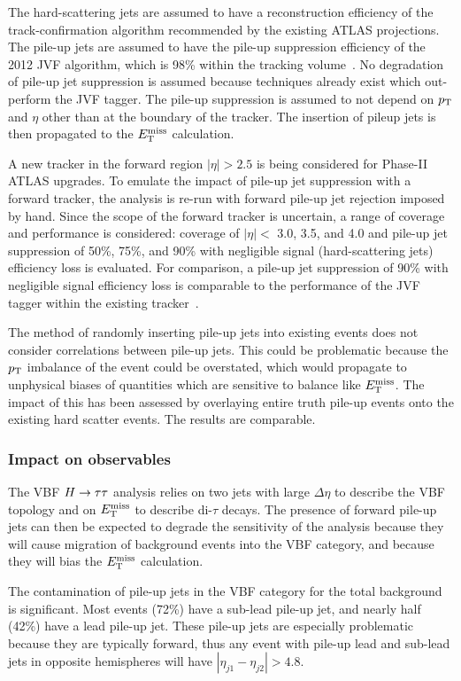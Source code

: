 The hard-scattering jets are assumed to have a reconstruction efficiency of the track-confirmation algorithm recommended by the existing ATLAS projections. The pile-up jets are assumed to have the pile-up suppression efficiency of the 2012 JVF algorithm, which is 98\% within the tracking volume~\cite{ATLAS-CONF-2014-018}. No degradation of pile-up jet suppression is assumed because techniques already exist which out-perform the JVF tagger. The pile-up suppression is assumed to not depend on $p_{\mathrm{T}}$ and $\eta$ other than at the boundary of the tracker. The insertion of pileup jets is then propagated to the $E_{\mathrm{T}}^{\mathrm{miss}}$ calculation.

A new tracker in the forward region $|\eta| > 2.5$ is being considered for Phase-II ATLAS upgrades. To emulate the impact of pile-up jet suppression with a forward tracker, the analysis is re-run with forward pile-up jet rejection imposed by hand. Since the scope of the forward tracker is uncertain, a range of coverage and performance is considered: coverage of $|\eta| < $ 3.0, 3.5, and 4.0 and pile-up jet suppression of 50\%, 75\%, and 90\% with negligible signal (hard-scattering jets) efficiency loss is evaluated. For comparison, a pile-up jet suppression of 90\% with negligible signal efficiency loss is comparable to the performance of the JVF tagger within the existing tracker~\cite{ATLAS-CONF-2014-018}.

The method of randomly inserting pile-up jets into existing events does not consider correlations between pile-up jets. This could be problematic because the $p_{\mathrm{T}}$ imbalance of the event could be overstated, which would propagate to unphysical biases of quantities which are sensitive to balance like $E_{\mathrm{T}}^{\mathrm{miss}}$. The impact of this has been assessed by overlaying entire truth pile-up events onto the existing hard scatter events. The results are comparable.

\subsubsection{Impact on observables}

The VBF $H\rightarrow\tau\tau$ analysis relies on two jets with large $\Delta\eta$ to describe the VBF topology and on $E_{\mathrm{T}}^{\mathrm{miss}}$ to describe di-$\tau$ decays. The presence of forward pile-up jets can then be expected to degrade the sensitivity of the analysis because they will cause migration of background events into the VBF category, and because they will bias the $E_{\mathrm{T}}^{\mathrm{miss}}$ calculation.

The contamination of pile-up jets in the VBF category for the total background is significant. Most events (72\%) have a sub-lead pile-up jet, and nearly half (42\%) have a lead pile-up jet. These pile-up jets are especially problematic because they are typically forward, thus any event with pile-up lead and sub-lead jets in opposite hemispheres will have $|\eta_{j1} - \eta_{j2}| > 4.8$.

